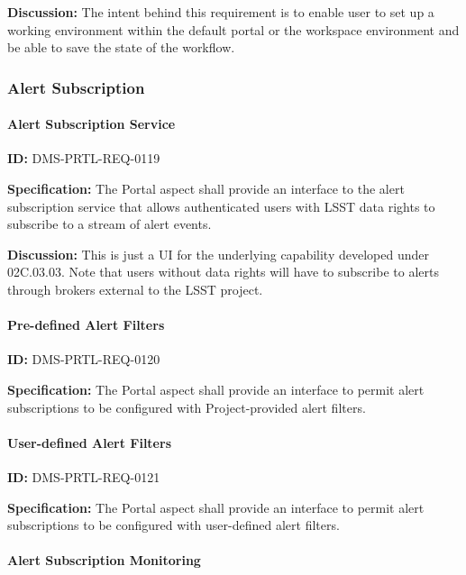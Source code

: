 \documentclass[SE,toc]{lsstdoc}
\begin{document}
\textbf{Discussion:}
The intent behind this requirement is to enable user to set up a working environment within the default portal or the workspace environment and be able to save the state of the workflow.

\subsubsection{Alert Subscription}

\paragraph{Alert Subscription Service}\hfill  %

\label{DMS-PRTL-REQ-0119}
\textbf{ID:} DMS-PRTL-REQ-0119

\textbf{Specification:}
The Portal aspect shall provide an interface to the alert subscription service that allows authenticated users with LSST data rights to subscribe to a stream of alert events.

\textbf{Discussion:}
This is just a UI for the underlying capability developed under 02C.03.03.
Note that users without data rights will have to subscribe to alerts through brokers external to the LSST project.

\paragraph{Pre-defined Alert Filters}\hfill  %

\label{DMS-PRTL-REQ-0120}
\textbf{ID:} DMS-PRTL-REQ-0120

\textbf{Specification:}
The Portal aspect shall provide an interface to permit alert subscriptions to be configured with Project-provided alert filters.

\paragraph{User-defined Alert Filters}\hfill  %

\label{DMS-PRTL-REQ-0121}
\textbf{ID:} DMS-PRTL-REQ-0121

\textbf{Specification:}
The Portal aspect shall provide an interface to permit alert subscriptions to be configured with user-defined alert filters.

\paragraph{Alert Subscription Monitoring}\hfill  %
\end{document}
